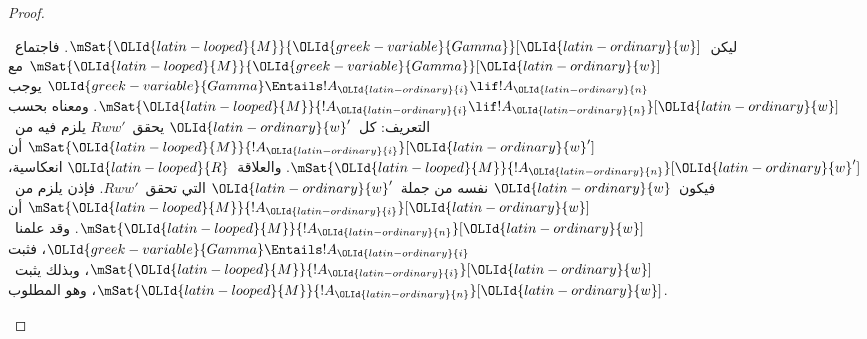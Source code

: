 \documentclass[../../../include/open-logic-section]{subfiles}
\begin{document}
\begin{proof}
\begin{enumerate}
    ليكن~$\mSat{\OLId{latin-looped}{M}}{\OLId{greek-variable}{Gamma}}[\OLId{latin-ordinary}{w}]$. فاجتماع~$\mSat{\OLId{latin-looped}{M}}{\OLId{greek-variable}{Gamma}}[\OLId{latin-ordinary}{w}]$ مع
    $\OLId{greek-variable}{Gamma} \Entails !A_\OLId{latin-ordinary}{i} \lif !A_\OLId{latin-ordinary}{n}$ يوجب
    $\mSat{\OLId{latin-looped}{M}}{!A_\OLId{latin-ordinary}{i} \lif !A_\OLId{latin-ordinary}{n}}[\OLId{latin-ordinary}{w}]$. ومعناه بحسب التعريف: كل~$\OLId{latin-ordinary}{w}'$
    يحقق~$Rww'$ يلزم فيه من~$\mSat{\OLId{latin-looped}{M}}{!A_\OLId{latin-ordinary}{i}}[\OLId{latin-ordinary}{w}']$ أن
    $\mSat{\OLId{latin-looped}{M}}{!A_\OLId{latin-ordinary}{n}}[\OLId{latin-ordinary}{w}']$. والعلاقة~$\OLId{latin-looped}{R}$ انعكاسية، فيكون~$\OLId{latin-ordinary}{w}$ نفسه من
    جملة~$\OLId{latin-ordinary}{w}'$ التي تحقق~$Rww'$. فإذن يلزم من~$\mSat{\OLId{latin-looped}{M}}{!A_\OLId{latin-ordinary}{i}}[\OLId{latin-ordinary}{w}]$ أن
    $\mSat{\OLId{latin-looped}{M}}{!A_\OLId{latin-ordinary}{n}}[\OLId{latin-ordinary}{w}]$. وقد علمنا~$\OLId{greek-variable}{Gamma} \Entails !A_\OLId{latin-ordinary}{i}$، فثبت
    $\mSat{\OLId{latin-looped}{M}}{!A_\OLId{latin-ordinary}{i}}[\OLId{latin-ordinary}{w}]$، وبذلك يثبت~$\mSat{\OLId{latin-looped}{M}}{!A_\OLId{latin-ordinary}{n}}[\OLId{latin-ordinary}{w}]$، وهو المطلوب.
  \end{enumerate}
\end{proof}
\end{document}
